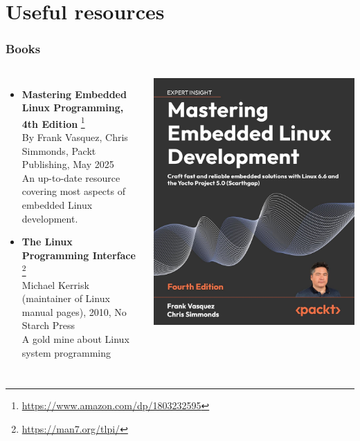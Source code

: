 \section{Useful resources}

\begin{frame}
  \frametitle{Books}
  \begin{columns}
    \small
    \begin{itemize}
    \item {\bf Mastering Embedded Linux Programming, 4th Edition}
      \footnote{\tiny
\url{https://www.amazon.com/dp/1803232595}}\\
      By Frank Vasquez, Chris Simmonds, Packt Publishing, May 2025\\
      An up-to-date resource covering most aspects of embedded Linux
      development.
    \item {\bf The Linux Programming Interface}
      \footnote{\tiny \url{https://man7.org/tlpi/}}\\
      Michael Kerrisk (maintainer of Linux manual pages), 2010, No Starch Press\\
      A gold mine about Linux system programming\\
    \end{itemize}
    \normalsize
    \includegraphics[height=0.25\textheight]{slides/linux-references/book-mastering-embedded-linux4.jpg}\\

\end{columns}
\end{frame}
